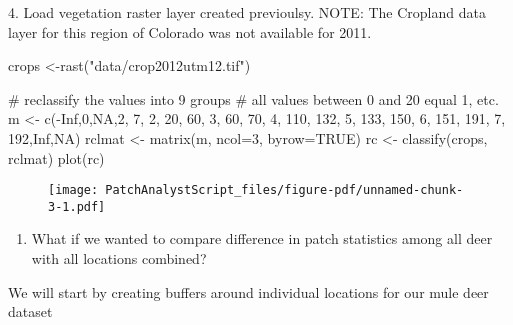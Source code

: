 \documentclass[
  letterpaper,
]{book}
\newenvironment{Shaded}{\begin{snugshade}}{\end{snugshade}}
\newcommand{\AttributeTok}[1]{\textcolor[rgb]{0.40,0.45,0.13}{#1}}
\newcommand{\CommentTok}[1]{\textcolor[rgb]{0.37,0.37,0.37}{#1}}
\newcommand{\ConstantTok}[1]{\textcolor[rgb]{0.56,0.35,0.01}{#1}}
\newcommand{\DecValTok}[1]{\textcolor[rgb]{0.68,0.00,0.00}{#1}}
\newcommand{\FunctionTok}[1]{\textcolor[rgb]{0.28,0.35,0.67}{#1}}
\newcommand{\NormalTok}[1]{\textcolor[rgb]{0.00,0.23,0.31}{#1}}
\newcommand{\OtherTok}[1]{\textcolor[rgb]{0.00,0.23,0.31}{#1}}
\newcommand{\SpecialCharTok}[1]{\textcolor[rgb]{0.37,0.37,0.37}{#1}}
\newcommand{\StringTok}[1]{\textcolor[rgb]{0.13,0.47,0.30}{#1}}
\providecommand{\tightlist}{%
  \setlength{\itemsep}{0pt}\setlength{\parskip}{0pt}}\usepackage{longtable,booktabs,array}
\begin{document}
4. Load vegetation raster layer created previoulsy. NOTE: The Cropland
data layer for this region of Colorado was not available for 2011.

\begin{Shaded}
\begin{Highlighting}[]
\NormalTok{crops }\OtherTok{\textless{}{-}}\FunctionTok{rast}\NormalTok{(}\StringTok{"data/crop2012utm12.tif"}\NormalTok{)}

\CommentTok{\# reclassify the values into 9 groups}
\CommentTok{\# all values between 0 and 20 equal 1, etc.}
\NormalTok{m }\OtherTok{\textless{}{-}} \FunctionTok{c}\NormalTok{(}\SpecialCharTok{{-}}\ConstantTok{Inf}\NormalTok{,}\DecValTok{0}\NormalTok{,}\ConstantTok{NA}\NormalTok{,}\DecValTok{2}\NormalTok{, }\DecValTok{7}\NormalTok{, }\DecValTok{2}\NormalTok{, }\DecValTok{20}\NormalTok{, }\DecValTok{60}\NormalTok{, }\DecValTok{3}\NormalTok{, }\DecValTok{60}\NormalTok{, }\DecValTok{70}\NormalTok{, }\DecValTok{4}\NormalTok{, }\DecValTok{110}\NormalTok{, }\DecValTok{132}\NormalTok{, }\DecValTok{5}\NormalTok{, }\DecValTok{133}\NormalTok{, }\DecValTok{150}\NormalTok{, }\DecValTok{6}\NormalTok{, }\DecValTok{151}\NormalTok{, }\DecValTok{191}\NormalTok{, }\DecValTok{7}\NormalTok{, }
  \DecValTok{192}\NormalTok{,}\ConstantTok{Inf}\NormalTok{,}\ConstantTok{NA}\NormalTok{)}
\NormalTok{rclmat }\OtherTok{\textless{}{-}} \FunctionTok{matrix}\NormalTok{(m, }\AttributeTok{ncol=}\DecValTok{3}\NormalTok{, }\AttributeTok{byrow=}\ConstantTok{TRUE}\NormalTok{)}
\NormalTok{rc }\OtherTok{\textless{}{-}} \FunctionTok{classify}\NormalTok{(crops, rclmat)}
\FunctionTok{plot}\NormalTok{(rc)}
\end{Highlighting}
\end{Shaded}

\begin{figure}[H]

{\centering \texttt{[image: PatchAnalystScript\_files/figure-pdf/unnamed-chunk-3-1.pdf]}

}

\end{figure}

\begin{enumerate}
\def\labelenumi{\arabic{enumi}.}
\setcounter{enumi}{4}
\tightlist
\item
  What if we wanted to compare difference in patch statistics among all
  deer with all locations combined?
\end{enumerate}

We will start by creating buffers around individual locations for our
mule deer dataset
\end{document}
